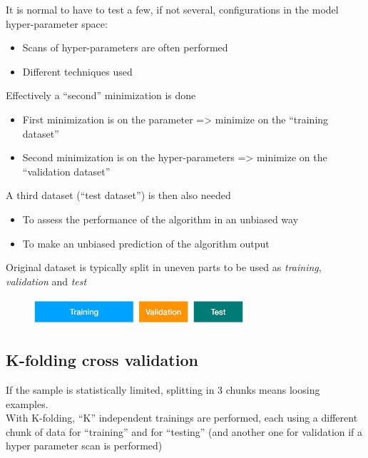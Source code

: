 It is normal to have to test a few, if not several, configurations in the model hyper-parameter space:
\begin{itemize}
	\item Scans of hyper-parameters are often performed
	\item Different techniques used
\end{itemize}


Effectively a “second” minimization is done

\begin{itemize}
	\item First minimization is on the parameter => minimize on the “training dataset”
	\item Second minimization is on the hyper-parameters => minimize on the “validation dataset”
\end{itemize}

A third dataset (“test dataset”) is then also needed

\begin{itemize}
	\item To assess the performance of the algorithm in an unbiased way
	\item To make an unbiased prediction of the algorithm output
\end{itemize}


Original dataset is typically split in uneven parts to be used as \textit{training}, \textit{validation} and \textit{test}

\begin{figure}[ht]
	\centering
	\includegraphics[width=0.7\textwidth]{figure_ml/hyperparams_optimization.png}
\end{figure}
\FloatBarrier

\subsection{K-folding cross validation}

If the sample is statistically limited, splitting in 3 chunks means loosing
examples.\\
With K-folding, “K” independent trainings are performed, each using a
different chunk of data for “training” and for “testing” (and another one for
validation if a hyper parameter scan is performed)

